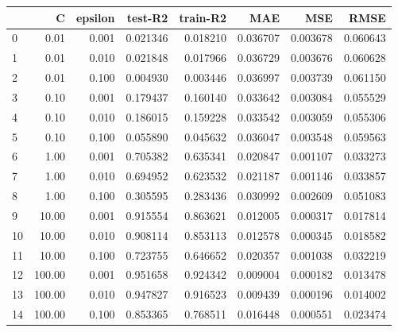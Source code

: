 \begin{tabular}{lrrrrrrr}
\toprule
{} &       C &  epsilon &   test-R2 &  train-R2 &       MAE &       MSE &      RMSE \\
\midrule
0  &    0.01 &    0.001 &  0.021346 &  0.018210 &  0.036707 &  0.003678 &  0.060643 \\
1  &    0.01 &    0.010 &  0.021848 &  0.017966 &  0.036729 &  0.003676 &  0.060628 \\
2  &    0.01 &    0.100 &  0.004930 &  0.003446 &  0.036997 &  0.003739 &  0.061150 \\
3  &    0.10 &    0.001 &  0.179437 &  0.160140 &  0.033642 &  0.003084 &  0.055529 \\
4  &    0.10 &    0.010 &  0.186015 &  0.159228 &  0.033542 &  0.003059 &  0.055306 \\
5  &    0.10 &    0.100 &  0.055890 &  0.045632 &  0.036047 &  0.003548 &  0.059563 \\
6  &    1.00 &    0.001 &  0.705382 &  0.635341 &  0.020847 &  0.001107 &  0.033273 \\
7  &    1.00 &    0.010 &  0.694952 &  0.623532 &  0.021187 &  0.001146 &  0.033857 \\
8  &    1.00 &    0.100 &  0.305595 &  0.283436 &  0.030992 &  0.002609 &  0.051083 \\
9  &   10.00 &    0.001 &  0.915554 &  0.863621 &  0.012005 &  0.000317 &  0.017814 \\
10 &   10.00 &    0.010 &  0.908114 &  0.853113 &  0.012578 &  0.000345 &  0.018582 \\
11 &   10.00 &    0.100 &  0.723755 &  0.646652 &  0.020357 &  0.001038 &  0.032219 \\
12 &  100.00 &    0.001 &  0.951658 &  0.924342 &  0.009004 &  0.000182 &  0.013478 \\
13 &  100.00 &    0.010 &  0.947827 &  0.916523 &  0.009439 &  0.000196 &  0.014002 \\
14 &  100.00 &    0.100 &  0.853365 &  0.768511 &  0.016448 &  0.000551 &  0.023474 \\
\bottomrule
\end{tabular}
